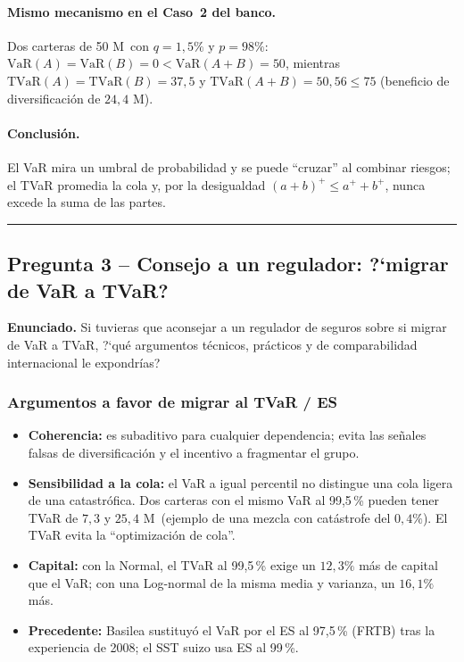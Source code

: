 \documentclass[a4paper,12pt]{article}
\newcommand{\euro}{\texteuro}
\newcommand{\VaR}{\mathrm{VaR}}
\newcommand{\TVaR}{\mathrm{TVaR}}
\begin{document}
\paragraph{Mismo mecanismo en el Caso~2 del banco.} Dos carteras de 50 M\euro\ con $q=1{,}5\%$ y $p=98\%$: $\VaR(A)=\VaR(B)=0<\VaR(A+B)=50$, mientras $\TVaR(A)=\TVaR(B)=37{,}5$ y $\TVaR(A+B)=50{,}56\le75$ (beneficio de diversificaci\'on de $24{,}4$ M\euro).

\paragraph{Conclusi\'on.} El VaR mira un umbral de probabilidad y se puede ``cruzar'' al combinar riesgos; el TVaR promedia la cola y, por la desigualdad $(a+b)^+\le a^++b^+$, nunca excede la suma de las partes.

\bigskip\hrule\bigskip

\subsection{Pregunta 3 -- Consejo a un regulador: ?`migrar de VaR a TVaR?}

\noindent\textbf{Enunciado.} Si tuvieras que aconsejar a un regulador de seguros sobre si migrar de VaR a TVaR, ?`qu\'e argumentos t\'ecnicos, pr\'acticos y de comparabilidad internacional le expondr\'ias?

\subsubsection*{Argumentos a favor de migrar al TVaR / ES}
\begin{itemize}[leftmargin=*,itemsep=2pt]
\item \textbf{Coherencia:} es subaditivo para cualquier dependencia; evita las se\~nales falsas de diversificaci\'on y el incentivo a fragmentar el grupo.
\item \textbf{Sensibilidad a la cola:} el VaR a igual percentil no distingue una cola ligera de una catastr\'ofica. Dos carteras con el mismo VaR al 99,5\,\% pueden tener TVaR de $7{,}3$ y $25{,}4$ M\euro\ (ejemplo de una mezcla con catástrofe del $0{,}4\%$). El TVaR evita la ``optimizaci\'on de cola''.
\item \textbf{Capital:} con la Normal, el TVaR al 99,5\,\% exige un $12{,}3\%$ m\'as de capital que el VaR; con una Log-normal de la misma media y varianza, un $16{,}1\%$ m\'as.
\item \textbf{Precedente:} Basilea sustituy\'o el VaR por el ES al 97,5\,\% (FRTB) tras la experiencia de 2008; el SST suizo usa ES al 99\,\%.
\end{itemize}
\end{document}
